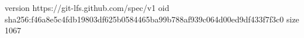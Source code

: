 version https://git-lfs.github.com/spec/v1
oid sha256:f46a8e5c4fdb19803df625b0584465ba99b788af939c064d00ed9df433f7f3c0
size 1067

